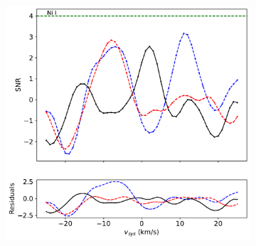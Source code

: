 \documentclass[twocolumn]{aastex631}
\begin{document}
\begin{figure}[ht!]
\begin{subfigure}[b]{0.3\textwidth}
                \end{subfigure}
                \begin{subfigure}[b]{0.3\textwidth}
                    \centering
                    \includegraphics[width=\textwidth]{plots-updated/line-profile-overlaidarms/KELT-20b.20190504.combined.Ni I.line-profiles-overlaidarms.pdf}
                \end{subfigure}
                \caption{}
                
            \end{figure}
\end{document}
